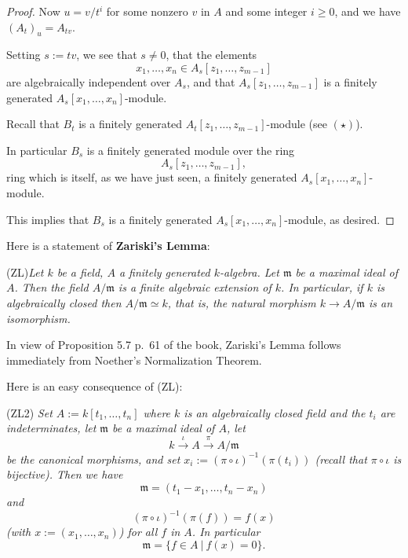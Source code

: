 \documentclass[parskip=half,fontsize=12pt]{scrartcl}%
\newcommand{\mf}{\mathfrak}
\begin{document}
\begin{proof}
Now $u=v/t^i$ for some nonzero $v$ in $A$ and some integer $i\ge0$, and we have $(A_t)_u=A_{tv}$. 

Setting $s:=tv$, we see that $s\ne0$, that the elements 
$$
x_1,\dots,x_n\in A_s[z_1,\dots,z_{m-1}]
$$ 
are algebraically independent over $A_s$, and that $A_s[z_1,\dots,z_{m-1}]$ is a finitely generated $A_s[x_1,\dots,x_n]$-module. 

Recall that $B_t$ is a finitely generated $A_t[z_1,\dots,z_{m-1}]$-module (see $(\star)$). 

In particular $B_s$ is a finitely generated module over the ring $$A_s[z_1,\dots,z_{m-1}],$$ ring which is itself, as we have just seen, a finitely generated $A_s[x_1,\dots,x_n]$-module. 

This implies that $B_s$ is a finitely generated $A_s[x_1,\dots,x_n]$-module, as desired.

\end{proof} 

Here is a statement of \textbf{Zariski's Lemma}:

(ZL)\emph{Let $k$ be a field, $A$ a finitely generated $k$-algebra. Let $\mf m$ be a maximal ideal of $A$. Then the field $A/\mf m$ is a finite algebraic extension of $k$. In particular, if $k$ is algebraically closed then $A/\mf m\simeq k$, that is, the natural morphism $k\to A/\mf m$ is an isomorphism.}

In view of Proposition 5.7 p.~61 of the book, Zariski's Lemma follows immediately from Noether's Normalization Theorem. %

Here is an easy consequence of (ZL):

(ZL2) \emph{Set $A:=k[t_1,\dots,t_n]$ where $k$ is an algebraically closed field and the $t_i$ are indeterminates, let $\mf m$ be a maximal ideal of $A$, let} 
$$
k\xrightarrow\iota A\xrightarrow{\pi}A/\mf m
$$ 
\emph{be the canonical morphisms, and set $x_i:=(\pi\circ\iota)^{-1}(\pi(t_i))$ (recall that $\pi\circ\iota$ is bijective). Then we have} 
$$
\mf m=(t_1-x_1,\dots,t_n-x_n)
$$ 
\emph{and} 
$$
(\pi\circ\iota)^{-1}(\pi(f))=f(x)
$$ 
\emph{(with $x:=(x_1,\dots,x_n)$) for all $f$ in $A$. In particular} 
$$
\mf m=\{f\in A\ |\ f(x)=0\}.
$$
\end{document}
